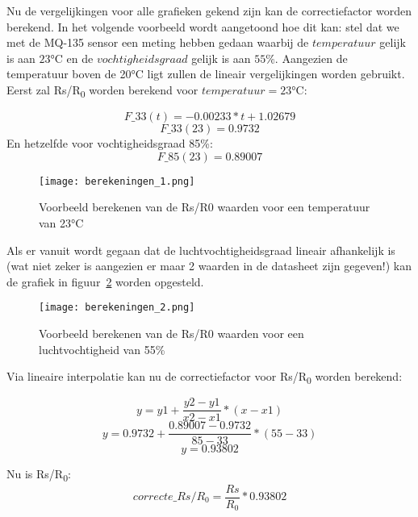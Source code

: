 Nu de vergelijkingen voor alle grafieken gekend zijn kan de correctiefactor worden berekend. In het volgende voorbeeld wordt aangetoond hoe dit kan: stel dat we met de MQ-135 sensor een meting hebben gedaan waarbij de $temperatuur$ gelijk is aan $23$°C en de $vochtigheidsgraad$ gelijk is aan $55\%$. Aangezien de temperatuur boven de 20°C ligt zullen de lineair vergelijkingen worden gebruikt.
Eerst zal Rs/R\textsubscript{0} worden berekend voor $temperatuur = 23$°C:

\begin{equation}
    F\_33(t) = -0.00233 * t + 1.02679
\end{equation}
\begin{equation}
    F\_33(23) = 0.9732
\end{equation}
En hetzelfde voor vochtigheidsgraad 85\%:
\begin{equation}
    F\_85(23) = 0.89007
\end{equation}

\begin{figure}[h]
    \texttt{[image: berekeningen\_1.png]}
    \caption[Voorbeeld berekenen Rs/R0 met temperatuur = 23°C]{Voorbeeld berekenen van de Rs/R0 waarden voor een temperatuur van 23°C}
    \label{fig:berekeningen_1}
\end{figure}

Als er vanuit wordt gegaan dat de luchtvochtigheidsgraad lineair afhankelijk is (wat niet zeker is aangezien er maar 2 waarden in de datasheet zijn gegeven!) kan de grafiek in figuur~\ref{fig:berekeningen_2} worden opgesteld.

\begin{figure}[h]
    \texttt{[image: berekeningen\_2.png]}
    \caption[Voorbeeld berekenen Rs/R0 met luchtvochtigheid = 55\%]{Voorbeeld berekenen van de Rs/R0 waarden voor een luchtvochtigheid van 55\%}
    \label{fig:berekeningen_2}
\end{figure}

Via lineaire interpolatie 
kan nu de correctiefactor voor Rs/R\textsubscript{0} worden berekend:

\begin{equation}
    y = y1 + \frac{y2 - y1}{x2 - x1}*(x - x1)
\end{equation}
\begin{equation}
    y = 0.9732 + \frac{0.89007 - 0.9732}{85 - 33}*(55 - 33)
\end{equation}
\begin{equation}
    y = 0.93802
\end{equation}

Nu is Rs/R\textsubscript{0}:
\begin{equation}
    correcte\_Rs/R_0 = \frac{Rs}{R_0} * 0.93802
\end{equation}


